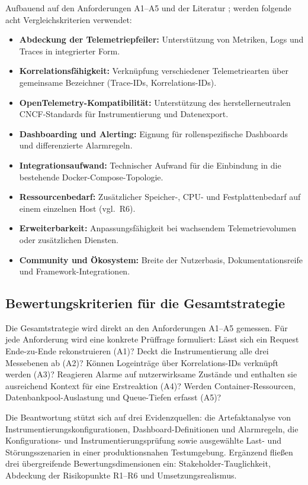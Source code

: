 Aufbauend auf den Anforderungen A1--A5 und der Literatur \parencite[S.~72014--72015]{faseeha2025observability}; \parencite[S.~3--4]{giamattei2024monitoring} werden folgende acht Vergleichskriterien verwendet:
 
\begin{itemize}
    \item \textbf{Abdeckung der Telemetriepfeiler:} Unterstützung von Metriken, Logs und Traces in integrierter Form.
    \item \textbf{Korrelationsfähigkeit:} Verknüpfung verschiedener Telemetriearten über gemeinsame Bezeichner (Trace-IDs, Korrelations-IDs).
    \item \textbf{OpenTelemetry-Kompatibilität:} Unterstützung des herstellerneutralen CNCF-Standards für Instrumentierung und Datenexport.
    \item \textbf{Dashboarding und Alerting:} Eignung für rollenspezifische Dashboards und differenzierte Alarmregeln.
    \item \textbf{Integrationsaufwand:} Technischer Aufwand für die Einbindung in die bestehende Docker-Compose-Topologie.
    \item \textbf{Ressourcenbedarf:} Zusätzlicher Speicher-, CPU- und Festplattenbedarf auf einem einzelnen Host (vgl.~R6).
    \item \textbf{Erweiterbarkeit:} Anpassungsfähigkeit bei wachsendem Telemetrievolumen oder zusätzlichen Diensten.
    \item \textbf{Community und Ökosystem:} Breite der Nutzerbasis, Dokumentationsreife und Framework-Integrationen.
\end{itemize}
 
\subsection{Bewertungskriterien für die Gesamtstrategie}
 
Die Gesamtstrategie wird direkt an den Anforderungen A1--A5 gemessen. Für jede Anforderung wird eine konkrete Prüffrage formuliert: Lässt sich ein Request Ende-zu-Ende rekonstruieren (A1)? Deckt die Instrumentierung alle drei Messebenen ab (A2)? Können Logeinträge über Korrelations-IDs verknüpft werden (A3)? Reagieren Alarme auf nutzerwirksame Zustände und enthalten sie ausreichend Kontext für eine Erstreaktion (A4)? Werden Container-Ressourcen, Datenbankpool-Auslastung und Queue-Tiefen erfasst (A5)?
 
Die Beantwortung stützt sich auf drei Evidenzquellen: die Artefaktanalyse von Instrumentierungskonfigurationen, Dashboard-Definitionen und Alarmregeln, die Konfigurations- und Instrumentierungsprüfung sowie ausgewählte Last- und Störungsszenarien in einer produktionsnahen Testumgebung. Ergänzend fließen drei übergreifende Bewertungsdimensionen ein: Stakeholder-Tauglichkeit, Abdeckung der Risikopunkte R1--R6 und Umsetzungsrealismus.